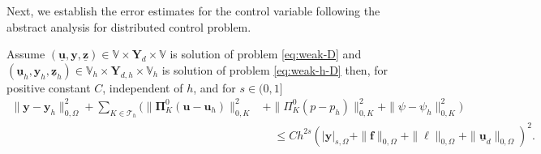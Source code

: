 \documentclass[smallextended]{svjour3}
\numberwithin{equation}{section}
\numberwithin{figure}{section}
\numberwithin{table}{section}
\newcommand\bI{\mathbf{I}}
\newcommand\bPi{\boldsymbol{\Pi}}
\newcommand\ff{\boldsymbol{f}}
\newcommand{\tP}{\tilde{P}}
\newcommand\buu{\underline{\boldsymbol{u}}}
\newcommand\buz{\underline{\boldsymbol{z}}}
\newcommand\by{\boldsymbol{y}}
\newcommand\bu{\boldsymbol{u}}
\newcommand\bz{\boldsymbol{z}}
\newcommand{\bYd}{\boldsymbol{Y}_d}
\newcommand{\bY}{\boldsymbol{Y}}
\newcommand\cT{\mathcal{T}}
\newcommand{\bbV}{\mathbb{V}}
\begin{document}
\noindent Next, we establish the error estimates for the control variable following the abstract analysis for distributed control problem.
\begin{theorem} \label{thm:control-est}
	Assume $(\buu, \by, \buz) \in \bbV \times \bYd \times \bbV$ is solution of problem 
    \eqref{eq:weak-D} and $(\buu_h, \by_h, \buz_h) \in \bbV_h \times \bY_{d,h} \times \bbV_h$ is solution of problem \eqref{eq:weak-h-D} then, for positive constant $C$, independent of $h$, and for $s \in (0, 1]$
	\begin{equation}\label{est:control}
	\begin{aligned} 
		\| \by - \by_h\|_{0, \Omega}^2 +  \sum_{K \in \cT_h} \big( \| \bPi^{0}_K (\bu - \bu_h) \|_{0, K}^2 & + \| \Pi^{0}_K (p-p_h) \|_{0, K}^2  + \| \psi - \psi_h \|_{0, K}^2  \big)\\
		& \quad \le C h^{2s} \left( |\by|_{s, \Omega}+ \|\ff\|_{0, \Omega} + \|\ell\|_{0, \Omega} + \|\buu_d\|_{0, \Omega} \right)^2.
	\end{aligned}
\end{equation}
\end{theorem}
\end{document}
